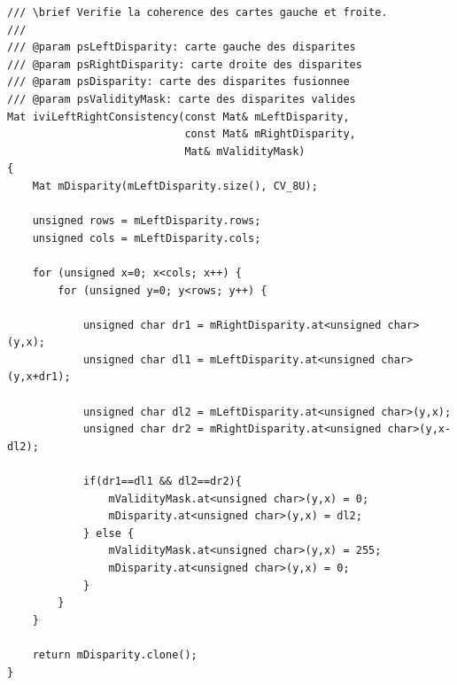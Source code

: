 \documentclass[a4paper,11pt]{article}
\begin{document}
\begin{figure}[H]
  \centering
\end{figure}

\begin{lstlisting}[caption=Fonction donnant la disparité cohérente gauche-droite]
/// \brief Verifie la coherence des cartes gauche et froite.
///
/// @param psLeftDisparity: carte gauche des disparites
/// @param psRightDisparity: carte droite des disparites
/// @param psDisparity: carte des disparites fusionnee
/// @param psValidityMask: carte des disparites valides
Mat iviLeftRightConsistency(const Mat& mLeftDisparity,
                            const Mat& mRightDisparity,
                            Mat& mValidityMask)
{
    Mat mDisparity(mLeftDisparity.size(), CV_8U);

    unsigned rows = mLeftDisparity.rows;
    unsigned cols = mLeftDisparity.cols;

    for (unsigned x=0; x<cols; x++) {
        for (unsigned y=0; y<rows; y++) {

            unsigned char dr1 = mRightDisparity.at<unsigned char>(y,x);
            unsigned char dl1 = mLeftDisparity.at<unsigned char>(y,x+dr1);

            unsigned char dl2 = mLeftDisparity.at<unsigned char>(y,x);
            unsigned char dr2 = mRightDisparity.at<unsigned char>(y,x-dl2);

            if(dr1==dl1 && dl2==dr2){
                mValidityMask.at<unsigned char>(y,x) = 0;
                mDisparity.at<unsigned char>(y,x) = dl2;
            } else {
                mValidityMask.at<unsigned char>(y,x) = 255;
                mDisparity.at<unsigned char>(y,x) = 0;
            }
        }
    }

    return mDisparity.clone();
}
\end{lstlisting}
\end{document}
